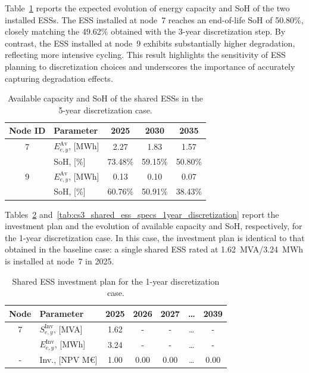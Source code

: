 \documentclass[preprint,12pt]{elsarticle}
\begin{document}
Table~\ref{tab:cs3_shared_ess_specs_5year_discretization} reports the expected evolution of energy capacity and SoH of the two installed ESSs. The ESS installed at node~7 reaches an end-of-life SoH of 50.80\%, closely matching the 49.62\% obtained with the 3-year discretization step. By contrast, the ESS installed at node~9 exhibits substantially higher degradation, reflecting more intensive cycling. This result highlights the sensitivity of ESS planning to discretization choices and underscores the importance of accurately capturing degradation effects.

\begin{table}[htbp!]
    \centering
    \caption{Available capacity and SoH of the shared ESSs in the 5-year discretization case.}
    \begin{tabular}{cl ccc}
        \toprule
        Node ID & Parameter & 2025 & 2030 & 2035\\ 
        \midrule
        7 & $E^{\text{Av}}_{e,y}$, [MWh]    & 2.27	    & 1.83	    & 1.57\\
        ~ & SoH, [\%]                       & 73.48\%   & 59.15\%   & 50.80\%\\
        \midrule
        9 & $E^{\text{Av}}_{e,y}$, [MWh]    & 0.13      & 0.10      & 0.07\\ 
        ~ & SoH, [\%]                       & 60.76\%   & 50.91\%   & 38.43\%\\ 
        \bottomrule
    \end{tabular}
    \label{tab:cs3_shared_ess_specs_5year_discretization}
\end{table}

Tables~\ref{tab:cs3_shared_ess_investment_plan_1year_discretization} and~\ref{tab:cs3_shared_ess_specs_1year_discretization} report the investment plan and the evolution of available capacity and SoH, respectively, for the 1-year discretization case. In this case, the investment plan is identical to that obtained in the baseline case: a single shared ESS rated at 1.62~MVA/3.24~MWh is installed at node~7 in 2025.

\begin{table}[htbp!]
    \centering
    \caption{Shared ESS investment plan for the 1-year discretization case.}
    \begin{tabular}{cl ccc c c}
        \toprule
        Node & Parameter                   & 2025 & 2026 & 2027 & \ldots & 2039\\ 
        \midrule
        7 & $S^{\text{Inv}}_{e,y}$, [MVA]  & 1.62  & - & - & \ldots & - \\
        ~ & $E^{\text{Inv}}_{e,y}$, [MWh]  & 3.24  & - & - & \ldots & - \\
        \midrule
        - & Inv., [NPV M\euro]             & 1.00  & 0.00  & 0.00 & \ldots & 0.00 \\
        \bottomrule
    \end{tabular}
    \label{tab:cs3_shared_ess_investment_plan_1year_discretization}
\end{table}
\end{document}
